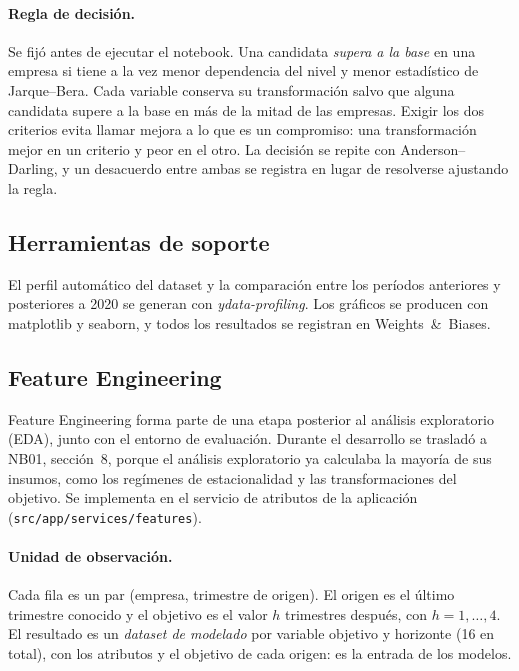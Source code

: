 \documentclass[12pt,letterpaper,oneside]{report}
\renewcommand{\_}{\UnderscoreOriginal\allowbreak}
\begin{document}
\paragraph{Regla de decisión.} Se fijó antes de ejecutar el notebook. Una candidata \emph{supera a la base} en una empresa si tiene a la vez menor dependencia del nivel y menor estadístico de Jarque--Bera. Cada variable conserva su transformación salvo que alguna candidata supere a la base en más de la mitad de las empresas. Exigir los dos criterios evita llamar mejora a lo que es un compromiso: una transformación mejor en un criterio y peor en el otro. La decisión se repite con Anderson--Darling, y un desacuerdo entre ambas se registra en lugar de resolverse ajustando la regla.

\subsection{Herramientas de soporte}

El perfil automático del dataset y la comparación entre los períodos anteriores y posteriores a 2020 se generan con \textit{ydata-profiling}. Los gráficos se producen con matplotlib y seaborn, y todos los resultados se registran en Weights~\&~Biases.

\subsection{Feature Engineering}
\label{sec:fe}

Feature Engineering forma parte de una etapa posterior al análisis exploratorio (EDA), junto con el entorno de evaluación. Durante el desarrollo se trasladó a NB01, sección~8, porque el análisis exploratorio ya calculaba la mayoría de sus insumos, como los regímenes de estacionalidad y las transformaciones del objetivo. Se implementa en el servicio de atributos de la aplicación (\texttt{src/app/services/features}).

\paragraph{Unidad de observación.} Cada fila es un par (empresa, trimestre de origen). El origen es el último trimestre conocido y el objetivo es el valor $h$ trimestres después, con $h = 1, \dots, 4$. El resultado es un \emph{dataset de modelado} por variable objetivo y horizonte (16 en total), con los atributos y el objetivo de cada origen: es la entrada de los modelos.
\end{document}
